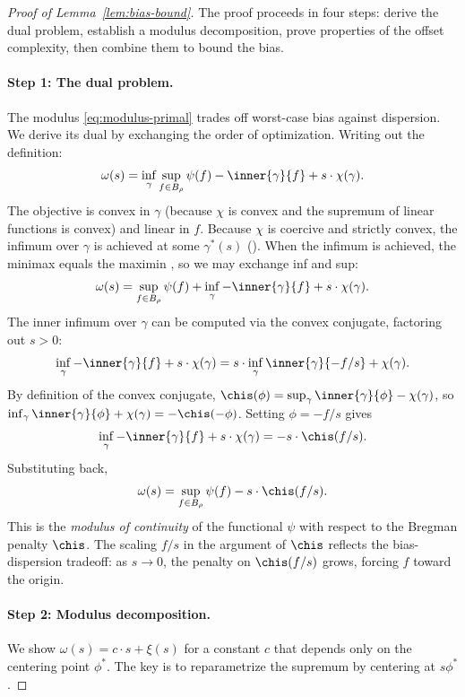 \documentclass{article}
\begin{document}
\begin{proof}[Proof of Lemma~\ref{lem:bias-bound}]
The proof proceeds in four steps: derive the dual problem, establish a modulus decomposition, prove properties of the offset complexity, then combine them to bound the bias.

\paragraph{Step 1: The dual problem.} The modulus \eqref{eq:modulus-primal} trades off worst-case bias against dispersion. We derive its dual by exchanging the order of optimization. Writing out the definition:
\[
\omega(s) = \inf_\gamma \sup_{f \in B_\rho} \psi(f) - \inner{\gamma}{f} + s \cdot \chi(\gamma).
\]
The objective is convex in $\gamma$ (because $\chi$ is convex and the supremum of linear functions is convex) and linear in $f$. Because $\chi$ is coercive and strictly convex, the infimum over $\gamma$ is achieved at some $\gamma^*(s)$ (). When the infimum is achieved, the minimax equals the maximin \citep[Proposition 2.63]{peypouquet2015convex}, so we may exchange inf and sup:
\[
\omega(s) = \sup_{f \in B_\rho} \psi(f) + \inf_\gamma -\inner{\gamma}{f} + s \cdot \chi(\gamma).
\]
The inner infimum over $\gamma$ can be computed via the convex conjugate, factoring out $s > 0$:
\[
\inf_\gamma -\inner{\gamma}{f} + s \cdot \chi(\gamma) = s \cdot \inf_\gamma \inner{\gamma}{-f/s} + \chi(\gamma).
\]
By definition of the convex conjugate, $\chis(\phi) = \sup_\gamma \inner{\gamma}{\phi} - \chi(\gamma)$, so $\inf_\gamma \inner{\gamma}{\phi} + \chi(\gamma) = -\chis(-\phi)$. Setting $\phi = -f/s$ gives
\[
\inf_\gamma -\inner{\gamma}{f} + s \cdot \chi(\gamma) = -s \cdot \chis(f/s).
\]
Substituting back,
\begin{equation}
\label{eq:modulus}
\omega(s) = \sup_{f \in B_\rho} \psi(f) - s \cdot \chis(f/s).
\end{equation}
This is the \emph{modulus of continuity} of the functional $\psi$ with respect to the Bregman penalty $\chis$. The scaling $f/s$ in the argument of $\chis$ reflects the bias-dispersion tradeoff: as $s \to 0$, the penalty on $\chis(f/s)$ grows, forcing $f$ toward the origin.

\paragraph{Step 2: Modulus decomposition.} We show $\omega(s) = c \cdot s + \xi(s)$ for a constant $c$ that depends only on the centering point $\phi^*$. The key is to reparametrize the supremum by centering at $s\phi^*$.


\end{proof}
\end{document}
